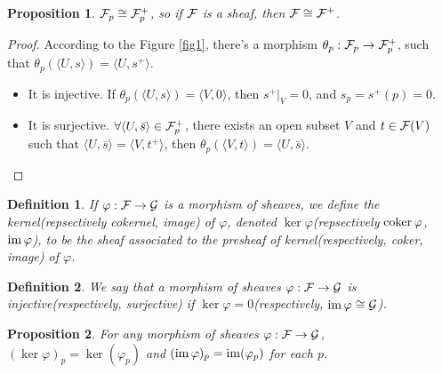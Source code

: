 \documentclass[9pt]{extarticle}
\theoremstyle{plain}
\newtheorem{pro}{Proposition}
\newtheorem{defi}{Definition}
\begin{document}
\begin{pro}
	$\mathcal{F}_p\cong \mathcal{F}^+_p$, so if $\mathcal{F}$ is a sheaf, then $\mathcal{F}\cong \mathcal{F}^+$.
	\label{pro:4}
\end{pro}
\begin{proof}
	According to the Figure \ref{fig1}, there's a morphism $\theta_p:\mathcal{F}_p\to \mathcal{F}^+_p$, such that $\theta_p(\langle U,s\rangle)=\langle U,s^+\rangle$.
	\begin{itemize}
	\item It is injective. If $\theta_p(\langle U,s\rangle)=\langle V,0\rangle$, then $s^+|_V=0$, and $s_p=s^+(p)=0$.

	\item It is surjective. $\forall \langle U,\bar{s}\rangle\in \mathcal{F}^+_p$, there exists an open subset $V$ and $t\in \mathcal{F}(V)$ such that $\langle U,\bar{s}\rangle=\langle V,t^+\rangle$, then $\theta_p(\langle V,t\rangle)=\langle U,\bar{s}\rangle$.
	\end{itemize}
\end{proof}
\begin{defi}
	If $\varphi:\mathcal{F}\to\mathcal{G}$ is a morphism of sheaves, we define the kernel(repsectively cokernel, image) of $\varphi$, denoted $\ker \varphi$(repsectively $\operatorname{coker} \varphi$, $\operatorname{im} \varphi$), to be the sheaf associated to the presheaf of kernel(respectively, coker, image) of $\varphi$.
\end{defi}
\begin{defi}
	We say that a morphism of sheaves $\varphi:\mathcal{F}\to\mathcal{G}$ is injective(respectively, surjective) if $\ker\varphi=0$(respectively, $\operatorname{im}\varphi\cong\mathcal{G}$).
\end{defi}
\begin{pro}
	For any morphism of sheaves $\varphi:\mathcal{F}\to\mathcal{G}$, $(\ker \varphi)_p=\ker(\varphi_p)$ and $(\operatorname{im} \varphi)_p=\operatorname{im}(\varphi_p)$ for each $p$.
	\label{pro:5}
\end{pro}
\end{document}
